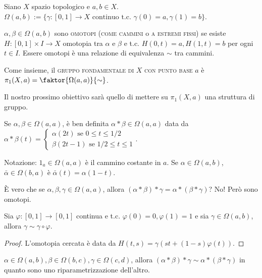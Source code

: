 Siano $X$ spazio topologico e $a, b \in X$. $\Omega(a, b):=\{\gamma:[0, 1] \longrightarrow X \text{ continuo t.c. } \gamma(0)=a, \gamma(1)=b\}$.

\begin{defn}
  $\alpha, \beta \in \Omega(a, b)$ sono \textsc{omotopi} (\textsc{come cammini} o \textsc{a estremi fissi}) se esiste $H:[0, 1] \times I \longrightarrow X$ omotopia tra $\alpha$ e $\beta$ e t.c. $H(0, t)=a, H(1, t)=b$ per ogni $t \in I$. Essere omotopi è una relazione di equivalenza $\sim$ tra cammini.
\end{defn}

\begin{defn}
  Come insieme, il \textsc{gruppo fondamentale di $X$ con punto base $a$} è $\pi_1(X, a)=\faktor{\Omega(a, a)}{\sim}$.
\end{defn}

Il nostro prossimo obiettivo sarà quello di mettere su $\pi_1(X, a)$ una struttura di gruppo.

Se $\alpha, \beta \in \Omega(a, a)$, è ben definita $\alpha * \beta \in \Omega(a, a)$ data da $\alpha * \beta (t)=\begin{cases} \alpha(2t) \text{ se } 0 \le t \le 1/2 \\
\beta(2t-1) \text{ se } 1/2 \le t \le 1 \end{cases}$.

Notazione: $1_a \in \Omega(a, a)$ è il cammino costante in $a$. Se $\alpha \in \Omega(a, b)$, $\bar{\alpha} \in \Omega(b, a)$ è $\bar{\alpha}(t)=\alpha(1-t)$.

È vero che se $\alpha, \beta, \gamma \in \Omega(a, a)$, allora $(\alpha * \beta) * \gamma=\alpha * (\beta * \gamma)$? No! Però sono omotopi. \marginpar{\warningsign}

\begin{lm}
  Sia $\varphi:[0, 1] \longrightarrow [0, 1]$ continua e t.c. $\varphi(0)=0, \varphi(1)=1$ e sia $\gamma \in \Omega(a, b)$, allora $\gamma \sim \gamma \circ \varphi$.
\end{lm}

\begin{proof}
  L'omotopia cercata è data da $H(t, s)=\gamma(st+(1-s)\varphi(t))$.
\end{proof}

\begin{cor}
  $\alpha \in \Omega(a, b), \beta \in \Omega(b, c), \gamma \in \Omega(c, d)$, allora $(\alpha * \beta) * \gamma \sim \alpha * (\beta * \gamma)$ in quanto sono uno riparametrizzazione dell'altro.
\end{cor}

